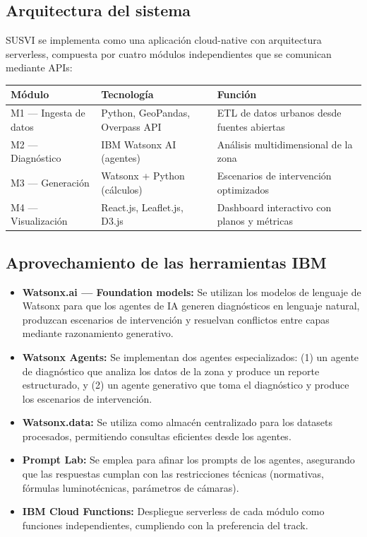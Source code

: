 \documentclass[12pt,a4paper]{article}
\begin{document}
\subsection{Arquitectura del sistema}

SUSVI se implementa como una aplicación cloud-native con arquitectura serverless, compuesta por cuatro módulos independientes que se comunican mediante APIs:

\begin{table}[H]
\centering
\small
\begin{tabularx}{\textwidth}{l l X}
\toprule
\textbf{Módulo} & \textbf{Tecnología} & \textbf{Función} \\
\midrule
M1 — Ingesta de datos & Python, GeoPandas, Overpass API & ETL de datos urbanos desde fuentes abiertas \\
M2 — Diagnóstico & IBM Watsonx AI (agentes) & Análisis multidimensional de la zona \\
M3 — Generación & Watsonx + Python (cálculos) & Escenarios de intervención optimizados \\
M4 — Visualización & React.js, Leaflet.js, D3.js & Dashboard interactivo con planos y métricas \\
\bottomrule
\end{tabularx}
\end{table}

\subsection{Aprovechamiento de las herramientas IBM}

\begin{itemize}[leftmargin=1.5cm]
    \item \textbf{Watsonx.ai — Foundation models:} Se utilizan los modelos de lenguaje de Watsonx para que los agentes de IA generen diagnósticos en lenguaje natural, produzcan escenarios de intervención y resuelvan conflictos entre capas mediante razonamiento generativo.
    
    \item \textbf{Watsonx Agents:} Se implementan dos agentes especializados: (1) un agente de diagnóstico que analiza los datos de la zona y produce un reporte estructurado, y (2) un agente generativo que toma el diagnóstico y produce los escenarios de intervención.
    
    \item \textbf{Watsonx.data:} Se utiliza como almacén centralizado para los datasets procesados, permitiendo consultas eficientes desde los agentes.
    
    \item \textbf{Prompt Lab:} Se emplea para afinar los prompts de los agentes, asegurando que las respuestas cumplan con las restricciones técnicas (normativas, fórmulas luminotécnicas, parámetros de cámaras).
    
    \item \textbf{IBM Cloud Functions:} Despliegue serverless de cada módulo como funciones independientes, cumpliendo con la preferencia del track.
\end{itemize}
\end{document}
